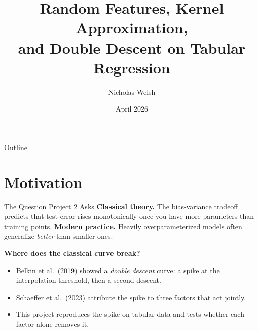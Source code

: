 \documentclass{beamer}
\title[Double Descent on Tabular Data]{Random Features, Kernel Approximation,\\and Double Descent on Tabular Regression}
\author[Welsh]{Nicholas Welsh}
\institute[FIT]{Florida Institute of Technology\\Department of Computer Science \& Mathematics}
\date{April 2026}
\begin{document}
\begin{frame}
  \titlepage
\end{frame}

\begin{frame}{Outline}
  \tableofcontents
\end{frame}

\section{Motivation}

\begin{frame}{The Question Project 2 Asks}
\textbf{Classical theory.} The bias-variance tradeoff predicts that test error rises monotonically once you have more parameters than training points.
\vfill
\textbf{Modern practice.} Heavily overparameterized models often generalize \emph{better} than smaller ones.
\vfill
\begin{center}
\large \textbf{Where does the classical curve break?}
\end{center}
\vfill
\footnotesize
\begin{itemize}\setlength\itemsep{2pt}
  \item Belkin et al.\ (2019) showed a \emph{double descent} curve: a spike at the interpolation threshold, then a second descent.
  \item Schaeffer et al.\ (2023) attribute the spike to three factors that act jointly.
  \item This project reproduces the spike on tabular data and tests whether each factor alone removes it.
\end{itemize}
\end{frame}
\end{document}
